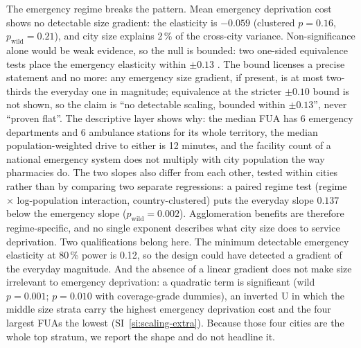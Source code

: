 \documentclass[11pt]{article}
\newcommand{\pw}[1]{$p_{\mathrm{wild}} = #1$}
\begin{document}
The emergency regime breaks the pattern. Mean emergency deprivation cost
shows no detectable size gradient: the elasticity is $-0.059$ (clustered
$p = 0.16$, \pw{0.21}), and city size explains 2\,\% of the cross-city
variance. Non-significance alone would be weak evidence, so the null is
bounded: two one-sided equivalence tests place the emergency elasticity
within $\pm 0.13$ \citep{lakens2017equivalence}. The bound licenses a
precise statement and no more: any emergency size gradient, if present, is
at most two-thirds the everyday one in magnitude; equivalence at the
stricter $\pm 0.10$ bound is not shown, so the claim is ``no detectable
scaling, bounded within $\pm 0.13$'', never ``proven flat''. The
descriptive layer shows why: the median FUA has 6 emergency departments
and 6 ambulance stations for its whole territory, the median
population-weighted drive to either is 12 minutes, and the facility count
of a national emergency system does not multiply with city population the
way pharmacies do. The two slopes also differ from each other, tested
within cities rather than by comparing two separate regressions: a paired
regime test (regime $\times$ log-population interaction, country-clustered)
puts the everyday slope $0.137$ below the emergency slope (\pw{0.002}).
Agglomeration benefits are therefore regime-specific, and no single
exponent describes what city size does to service deprivation. Two
qualifications belong here. The minimum detectable emergency elasticity
at 80\,\% power is 0.12, so the design could have detected a gradient
of the everyday magnitude. And the absence of a linear gradient does not
make size irrelevant to emergency deprivation: a quadratic term is
significant (wild $p = 0.001$; $p = 0.010$ with coverage-grade dummies),
an inverted U in which the middle size strata carry the highest emergency
deprivation cost and the four largest FUAs the lowest
(SI~\ref{si:scaling-extra}). Because those four cities are the whole top
stratum, we report the shape and do not headline it.
\end{document}
